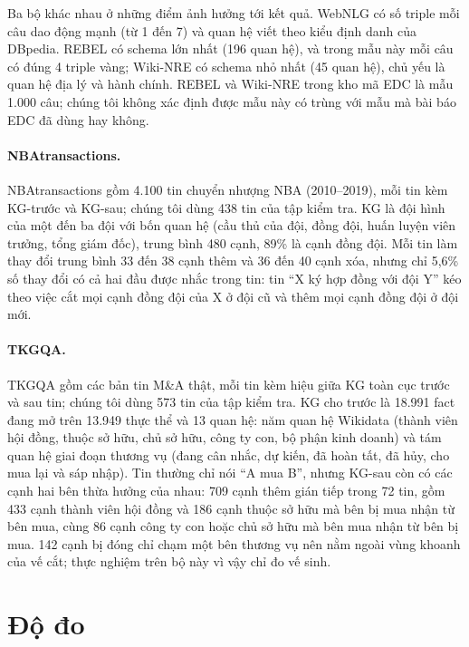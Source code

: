 Ba bộ khác nhau ở những điểm ảnh hưởng tới kết quả. WebNLG có số triple mỗi câu dao động mạnh (từ 1 đến 7) và quan hệ viết theo kiểu định danh của DBpedia.
REBEL có schema lớn nhất (196 quan hệ), và trong mẫu này mỗi câu có đúng 4 triple vàng; Wiki-NRE có schema nhỏ nhất (45 quan hệ), chủ yếu là quan hệ địa lý và hành chính.
REBEL và Wiki-NRE trong kho mã EDC là mẫu 1.000 câu; chúng tôi không xác định được mẫu này có trùng với mẫu mà bài báo EDC đã dùng hay không.

\paragraph*{NBAtransactions.}
NBAtransactions gồm 4.100 tin chuyển nhượng NBA (2010--2019), mỗi tin kèm KG-trước và KG-sau; chúng tôi dùng 438 tin của tập kiểm tra.
KG là đội hình của một đến ba đội với bốn quan hệ (cầu thủ của đội, đồng đội, huấn luyện viên trưởng, tổng giám đốc), trung bình 480 cạnh, 89\% là cạnh đồng đội.
Mỗi tin làm thay đổi trung bình 33 đến 38 cạnh thêm và 36 đến 40 cạnh xóa, nhưng chỉ 5,6\% số thay đổi có cả hai đầu được nhắc trong tin: tin ``X ký hợp đồng với đội Y'' kéo theo việc cắt mọi cạnh đồng đội của X ở đội cũ và thêm mọi cạnh đồng đội ở đội mới.

\paragraph*{TKGQA.}
TKGQA gồm các bản tin M\&A thật, mỗi tin kèm hiệu giữa KG toàn cục trước và sau tin; chúng tôi dùng 573 tin của tập kiểm tra.
KG cho trước là 18.991 fact đang mở trên 13.949 thực thể và 13 quan hệ: năm quan hệ Wikidata (thành viên hội đồng, thuộc sở hữu, chủ sở hữu, công ty con, bộ phận kinh doanh) và tám quan hệ giai đoạn thương vụ (đang cân nhắc, dự kiến, đã hoàn tất, đã hủy, cho mua lại và sáp nhập).
Tin thường chỉ nói ``A mua B'', nhưng KG-sau còn có các cạnh hai bên thừa hưởng của nhau: 709 cạnh thêm gián tiếp trong 72 tin, gồm 433 cạnh thành viên hội đồng và 186 cạnh thuộc sở hữu mà bên bị mua nhận từ bên mua, cùng 86 cạnh công ty con hoặc chủ sở hữu mà bên mua nhận từ bên bị mua.
142 cạnh bị đóng chỉ chạm một bên thương vụ nên nằm ngoài vùng khoanh của vế cắt; thực nghiệm trên bộ này vì vậy chỉ đo vế sinh.

\section{Độ đo}\label{sec:exp-metrics}

